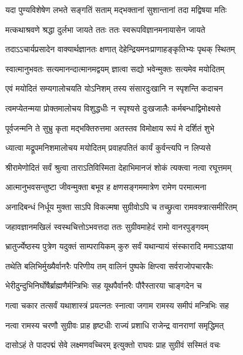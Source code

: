 \twolineshloka
{यदा पुण्यविशेषेण लभते सङ्गतिं सताम्}
{मद्भक्तानां सुशान्तानां तदा मद्विषया मतिः} %

\twolineshloka
{मत्कथाश्रवणे श्रद्धा दुर्लभा जायते ततः}
{ततः स्वरूपविज्ञानमनायासेन जायते} %

\twolineshloka
{तदाऽऽचार्यप्रसादेन वाक्यार्थज्ञानतः क्षणात्}
{देहेन्द्रियमनःप्राणाहङ्कृतिभ्यः पृथक् स्थितम्} %

\twolineshloka
{स्वात्मानुभवतः सत्यमानन्दात्मानमद्वयम्}
{ज्ञात्वा सद्यो भवेन्मुक्तः सत्यमेव मयोदितम्} %

\twolineshloka
{एवं मयोदितं सम्यगालोचयति योऽनिशम्}
{तस्य संसारदुःखानि न स्पृशन्ति कदाचन} %

\twolineshloka
{त्वमप्येतन्मया प्रोक्तमालोचय विशुद्धधीः}
{न स्पृश्यसे दुःखजालैः कर्मबन्धाद्विमोक्ष्यसे} %

\twolineshloka
{पूर्वजन्मनि ते सुभ्रु कृता मद्भक्तिरुत्तमा}
{अतस्तव विमोक्षाय रूपं मे दर्शितं शुभे} %

\twolineshloka
{ध्यात्वा मद्रूपमनिशमालोचय मयोदितम्}
{प्रवाहपतितं कार्यं कुर्वन्त्यपि न लिप्यसे} %

\twolineshloka
{श्रीरामेणोदितं सर्वं श्रुत्वा ताराऽतिविस्मिता}
{देहाभिमानजं शोकं त्यक्त्वा नत्वा रघूत्तमम्} %

\twolineshloka
{आत्मानुभवसन्तुष्टा जीवन्मुक्ता बभूव ह}
{क्षणसङ्गममात्रेण रामेण परमात्मना} %

\twolineshloka
{अनादिबन्धं निर्धूय मुक्ता साऽपि विकल्मषा}
{सुग्रीवोऽपि च तच्छ्रुत्वा रामवक्त्रात्समीरितम्} %

\twolineshloka
{जहावज्ञानमखिलं स्वस्थचित्तोऽभवत्तदा}
{ततः सुग्रीवमाहेदं रामो वानरपुङ्गवम्} %

\twolineshloka
{भ्रातुर्ज्येष्ठस्य पुत्रेण यदुक्तं साम्परायिकम्}
{कुरु सर्वं यथान्यायं संस्कारादि ममाऽऽज्ञया} %

\twolineshloka
{तथेति बलिभिर्मुख्यैर्वानरैः परिणीय तम्}
{वालिनं पुष्पके क्षिप्त्वा सर्वराजोपचारकैः} %

\twolineshloka
{भेरीदुन्दुभिनिर्घोषैर्ब्राह्मणैर्मन्त्रिभिः सह}
{यूथपैर्वानरैः पौरैस्तारया चाङ्गदेन च} %

\twolineshloka
{गत्वा चकार तत्सर्वं यथाशास्त्रं प्रयत्नतः}
{स्नात्वा जगाम रामस्य समीपं मन्त्रिभिः सह} %

\twolineshloka
{नत्वा रामस्य चरणौ सुग्रीवः प्राह हृष्टधीः}
{राज्यं प्रशाधि राजेन्द्र वानराणां समृद्धिमत्} %

\twolineshloka
{दासोऽहं ते पादपद्मं सेवे लक्ष्मणवच्चिरम्}
{इत्युक्तो राघवः प्राह सुग्रीवं सस्मितं वचः} %

